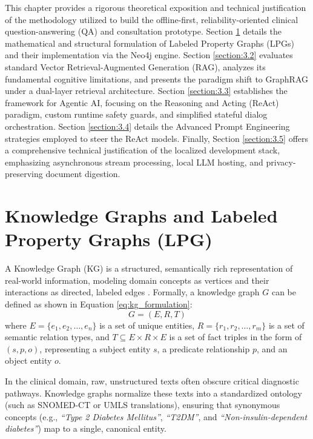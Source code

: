 \documentclass[../main.tex]{subfiles}
\begin{document}
This chapter provides a rigorous theoretical exposition and technical justification of the methodology utilized to build the offline-first, reliability-oriented clinical question-answering (QA) and consultation prototype. Section \ref{section:3.1} details the mathematical and structural formulation of Labeled Property Graphs (LPGs) and their implementation via the Neo4j engine. Section \ref{section:3.2} evaluates standard Vector Retrieval-Augmented Generation (RAG), analyzes its fundamental cognitive limitations, and presents the paradigm shift to GraphRAG under a dual-layer retrieval architecture. Section \ref{section:3.3} establishes the framework for Agentic AI, focusing on the Reasoning and Acting (ReAct) paradigm, custom runtime safety guards, and simplified stateful dialog orchestration. Section \ref{section:3.4} details the Advanced Prompt Engineering strategies employed to steer the ReAct models. Finally, Section \ref{section:3.5} offers a comprehensive technical justification of the localized development stack, emphasizing asynchronous stream processing, local LLM hosting, and privacy-preserving document digestion.

\section{Knowledge Graphs and Labeled Property Graphs (LPG)}
\label{section:3.1}

A Knowledge Graph (KG) is a structured, semantically rich representation of real-world information, modeling domain concepts as vertices and their interactions as directed, labeled edges \cite{robinson2015graph}. Formally, a knowledge graph $G$ can be defined as shown in Equation \eqref{eq:kg_formulation}:
\begin{equation}\label{eq:kg_formulation}
G = (E, R, T)
\end{equation}
where $E = \{e_1, e_2, \dots, e_n\}$ is a set of unique entities, $R = \{r_1, r_2, \dots, r_m\}$ is a set of semantic relation types, and $T \subseteq E \times R \times E$ is a set of fact triples in the form of $(s, p, o)$, representing a subject entity $s$, a predicate relationship $p$, and an object entity $o$.

In the clinical domain, raw, unstructured texts often obscure critical diagnostic pathways. Knowledge graphs normalize these texts into a standardized ontology (such as SNOMED-CT or UMLS translations), ensuring that synonymous concepts (e.g., \textit{``Type 2 Diabetes Mellitus''}, \textit{``T2DM''}, and \textit{``Non-insulin-dependent diabetes''}) map to a single, canonical entity.
\end{document}
